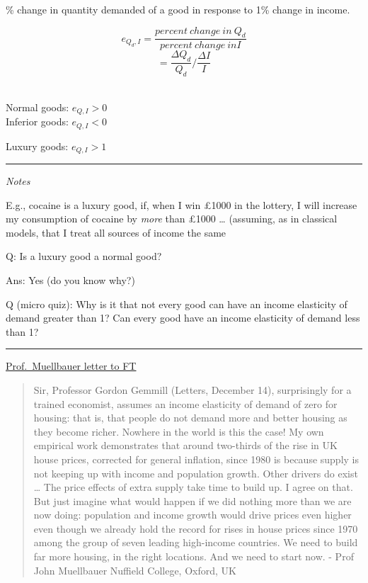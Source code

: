 \documentclass[]{article}
\providecommand{\tightlist}{%
  \setlength{\itemsep}{0pt}\setlength{\parskip}{0pt}}
\begin{document}
\begin{description}
\tightlist
\item[Income elasticity of demand]
\% change in quantity demanded of a good in response to 1\% change in income.
\end{description}

\[e_{Q_d,I} = \frac{percent \ change \ in \ Q_d}{percent \ change \ in I} \]
\[  = \frac{\Delta Q_d}{Q_d}/\frac{\Delta I}{I}\]\\

\bigskip

Normal goods: \(e_{Q,I} > 0\)\\

Inferior goods: \(e_{Q,I} < 0\)

\bigskip

Luxury goods: \(e_{Q,I} > 1\)

\begin{center}\rule{0.5\linewidth}{\linethickness}\end{center}

\emph{Notes}

E.g., cocaine is a luxury good, if, when I win £1000 in the lottery, I will increase my consumption of cocaine by \emph{more} than £1000 \ldots{}
(assuming, as in classical models, that I treat all sources of income the same

Q: Is a luxury good a normal good?

Ans: Yes (do you know why?)

\bigskip

Q (micro quiz): Why is it that not every good can have an income elasticity of demand greater than 1?
Can every good have an income elasticity of demand less than 1?

\begin{center}\rule{0.5\linewidth}{\linethickness}\end{center}

\href{https://www.ft.com/content/4ea79d96-a4d6-11e5-a91e-162b86790c58}{Prof.~Muellbauer letter to FT}

\begin{quote}
Sir, Professor Gordon Gemmill (Letters, December 14), surprisingly for a trained economist, assumes an income elasticity of demand of zero for housing: that is, that people do not demand more and better housing as they become richer. Nowhere in the world is this the case! My own empirical work demonstrates that around two-thirds of the rise in UK house prices, corrected for general inflation, since 1980 is because supply is not keeping up with income and population growth. Other drivers do exist \ldots{} The price effects of extra supply take time to build up. I agree on that. But just imagine what would happen if we did nothing more than we are now doing: population and income growth would drive prices even higher even though we already hold the record for rises in house prices since 1970 among the group of seven leading high-income countries. We need to build far more housing, in the right locations. And we need to start now.
- Prof John Muellbauer Nuffield College, Oxford, UK
\end{quote}
\end{document}
